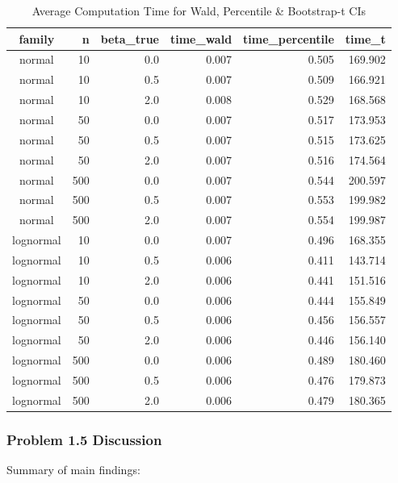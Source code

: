 \documentclass[
]{article}
\begin{document}
\begin{table}[!t]
\caption*{
{\large Average Computation Time for Wald, Percentile \& Bootstrap-t CIs}
} 
\fontsize{12.0pt}{14.4pt}\selectfont
\begin{tabular*}{\linewidth}{@{\extracolsep{\fill}}crrrrr}
\toprule
family & n & beta\_true & time\_wald & time\_percentile & time\_t \\ 
\midrule\addlinespace[2.5pt]
normal & 10 & 0.0 & 0.007 & 0.505 & 169.902 \\ 
normal & 10 & 0.5 & 0.007 & 0.509 & 166.921 \\ 
normal & 10 & 2.0 & 0.008 & 0.529 & 168.568 \\ 
normal & 50 & 0.0 & 0.007 & 0.517 & 173.953 \\ 
normal & 50 & 0.5 & 0.007 & 0.515 & 173.625 \\ 
normal & 50 & 2.0 & 0.007 & 0.516 & 174.564 \\ 
normal & 500 & 0.0 & 0.007 & 0.544 & 200.597 \\ 
normal & 500 & 0.5 & 0.007 & 0.553 & 199.982 \\ 
normal & 500 & 2.0 & 0.007 & 0.554 & 199.987 \\ 
lognormal & 10 & 0.0 & 0.007 & 0.496 & 168.355 \\ 
lognormal & 10 & 0.5 & 0.006 & 0.411 & 143.714 \\ 
lognormal & 10 & 2.0 & 0.006 & 0.441 & 151.516 \\ 
lognormal & 50 & 0.0 & 0.006 & 0.444 & 155.849 \\ 
lognormal & 50 & 0.5 & 0.006 & 0.456 & 156.557 \\ 
lognormal & 50 & 2.0 & 0.006 & 0.446 & 156.140 \\ 
lognormal & 500 & 0.0 & 0.006 & 0.489 & 180.460 \\ 
lognormal & 500 & 0.5 & 0.006 & 0.476 & 179.873 \\ 
lognormal & 500 & 2.0 & 0.006 & 0.479 & 180.365 \\ 
\bottomrule
\end{tabular*}
\end{table}

\subsubsection{Problem 1.5 Discussion}\label{problem-1.5-discussion}

Summary of main findings:
\end{document}
